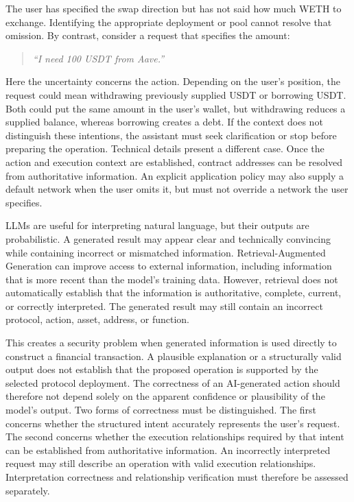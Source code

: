The user has specified the swap direction but has not said how much WETH
to exchange. Identifying the appropriate deployment or pool cannot resolve
that omission. By contrast, consider a request that specifies the amount:

\begin{quote}
\textit{``I need 100 USDT from Aave.''}
\end{quote}

Here the uncertainty concerns the action. Depending on the user's position,
the request could mean withdrawing previously supplied USDT or borrowing
USDT. Both could put the same amount in the user's wallet, but withdrawing
reduces a supplied balance, whereas borrowing creates a debt. If the
context does not distinguish these intentions, the assistant must seek
clarification or stop before preparing the operation. Technical details present a different case. Once the action and execution
context are established, contract addresses can be resolved from
authoritative information. An explicit application policy may also supply
a default network when the user omits it, but must not override a network
the user specifies.

LLMs are useful for interpreting natural language, but their outputs
are probabilistic. A generated result may appear clear and technically
convincing while containing incorrect or mismatched information.
Retrieval-Augmented Generation can improve access to external
information, including information that is more recent than the model's
training data. However, retrieval does not automatically establish that
the information is authoritative, complete, current, or correctly
interpreted. The generated result may still contain an incorrect
protocol, action, asset, address, or function.

This creates a security problem when generated information is used
directly to construct a financial transaction. A plausible explanation
or a structurally valid output does not establish that the proposed
operation is supported by the selected protocol deployment. The
correctness of an AI-generated action should therefore not depend
solely on the apparent confidence or plausibility of the model's output. Two forms of correctness must be distinguished. The first concerns
whether the structured intent accurately represents the user's request.
The second concerns whether the execution relationships required by
that intent can be established from authoritative information. An
incorrectly interpreted request may still describe an operation with
valid execution relationships. Interpretation correctness and
relationship verification must therefore be assessed separately.


